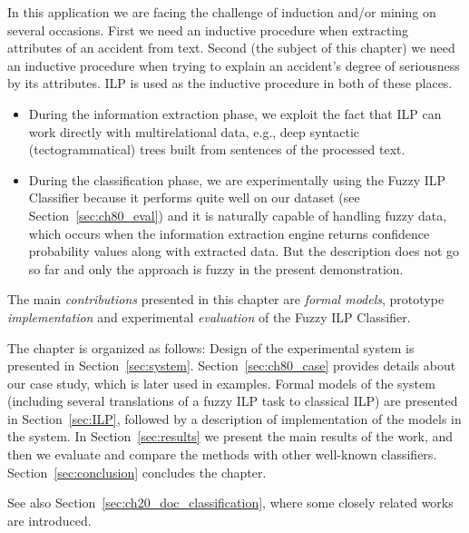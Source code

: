 In this application we are facing the challenge of induction and/or mining on several occasions. First we need an inductive procedure when extracting attributes of an accident from text. Second (the subject of this chapter) we need an inductive procedure when trying to explain an accident's degree of seriousness by its attributes. ILP is used as the inductive procedure in both of these places.
\begin{itemize}
	\item During the information extraction phase, we exploit the fact that ILP can work directly with multirelational data, e.g., deep syntactic (tectogrammatical) trees built from sentences of the processed text.
	\item During the classification phase, we are experimentally using the Fuzzy ILP Classifier because it performs quite well on our dataset (see Section~\ref{sec:ch80_eval}) and it is naturally capable of handling fuzzy data, which occurs when the information extraction engine returns confidence probability values along with extracted data. But the description does not go so far and only the approach is fuzzy in the present demonstration.
\end{itemize}

The main \emph{contributions} presented in this chapter are \emph{formal models}, prototype \emph{implementation} and experimental \emph{evaluation} of the Fuzzy ILP Classifier.
\medskip

The chapter is organized as follows: Design of the experimental system is presented in Section~\ref{sec:system}. %
Section~\ref{sec:ch80_case} provides details about our case study, which is later used in examples. Formal models of the system (including several translations of a fuzzy ILP task to classical ILP) are presented in Section~\ref{sec:ILP}, followed by a description of implementation of the models in the system. In Section~\ref{sec:results} we present the main results of the work, and then we evaluate and compare the methods with other well-known classifiers. Section~\ref{sec:conclusion} concludes the chapter.

See also Section~\ref{sec:ch20_doc_classification}, where some closely related works are introduced. 

 



